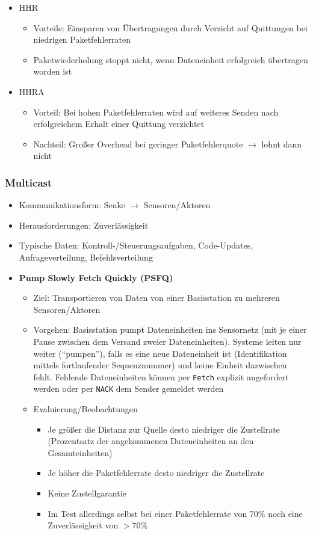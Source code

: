 \begin{itemize}
\begin{itemize}
\begin{itemize}
			\item HHR
			\begin{itemize}
				\item Vorteile: Einsparen von Übertragungen durch Verzicht auf Quittungen bei niedrigen Paketfehlerraten
				\item Paketwiederholung stoppt nicht, wenn Dateneinheit erfolgreich übertragen worden ist
			\end{itemize}
			\item HHRA
			\begin{itemize}
				\item Vorteil: Bei hohen Paketfehlerraten wird auf weiteres Senden nach erfolgreichem Erhalt einer Quittung verzichtet
				\item Nachteil: Großer Overhead bei geringer Paketfehlerquote \(\rightarrow\) lohnt dann nicht
			\end{itemize}
		\end{itemize}
	\end{itemize}
\end{itemize}

\subsubsection{Multicast}
\begin{itemize}
	\item Kommunikationsform: Senke \(\rightarrow\) Sensoren/Aktoren
	\item Herausforderungen: Zuverlässigkeit
	\item Typische Daten: Kontroll-/Steuerungsaufgaben, Code-Updates, Anfrageverteilung, Befehlsverteilung
	\item \textbf{Pump Slowly Fetch Quickly (PSFQ)}
	\begin{itemize}
		\item Ziel: Transportieren von Daten von einer Basisstation zu mehreren Sensoren/Aktoren
		\item Vorgehen: Basisstation pumpt Dateneinheiten ins Sensornetz (mit je einer Pause zwischen dem Versand zweier Dateneinheiten). Systeme leiten nur weiter ("`pumpen"'), falls es eine neue Dateneinheit ist (Identifikation mittels fortlaufender Sequenznummer) und keine Einheit dazwischen fehlt. Fehlende Dateneinheiten können per \texttt{Fetch} explizit angefordert werden oder per \texttt{NACK} dem Sender gemeldet werden
		\item Evaluierung/Beobachtungen
		\begin{itemize}
			\item Je größer die Distanz zur Quelle desto niedriger die Zustellrate (Prozentsatz der angekommenen Dateneinheiten an den Gesamteinheiten)
			\item Je höher die Paketfehlerrate desto niedriger die Zustellrate
			\item Keine Zustellgarantie
			\item Im Test allerdings selbst bei einer Paketfehlerrate von \(70\%\) noch eine Zuverlässigkeit von \(>70\%\)
		\end{itemize}
	\end{itemize}
\end{itemize}

